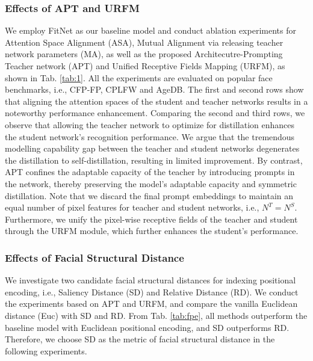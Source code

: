\documentclass[sigconf]{acmart}
\begin{document}
\subsubsection{Effects of APT and URFM}
\label{section:ablation}
We employ FitNet \cite{fitnet} as our baseline model and conduct ablation experiments for Attention Space Alignment (ASA), Mutual Alignment via releasing teacher network parameters (MA), as well as the proposed Architecutre-Prompting Teacher network (APT) and Unified Receptive Fields Mapping (URFM), as shown in Tab. \ref{tab:1}. All the experiments are evaluated on popular face benchmarks, i.e., CFP-FP, CPLFW and AgeDB. The first and second rows show that aligning the attention spaces of the student and teacher networks results in a noteworthy performance enhancement. Comparing the second and third rows, we observe that allowing the teacher network to optimize for distillation enhances the student network's recognition performance. We argue that the tremendous modelling capability gap between the teacher and student networks degenerates the distillation to self-distillation, resulting in limited improvement. By contrast, APT confines the adaptable capacity of the teacher by introducing prompts in the network, thereby preserving the model's adaptable capacity and symmetric distillation. Note that we discard the final prompt embeddings to maintain an equal number of pixel features for teacher and student networks, i.e., $N^T=N^S$. Furthermore, we unify the pixel-wise receptive fields of the teacher and student through the URFM module, which further enhances the student's performance.

\subsubsection{Effects of Facial Structural Distance} We investigate two candidate facial structural distances for indexing positional encoding, i.e., Saliency Distance (SD) and Relative Distance (RD). We conduct the experiments based on APT and URFM, and compare the vanilla Euclidean distance (Euc) with SD and RD. From Tab. \ref{tab:fpe}, all methods outperform the baseline model with Euclidean positional encoding, and SD outperforms RD. Therefore, we choose SD as the metric of facial structural distance in the following experiments.
\end{document}
